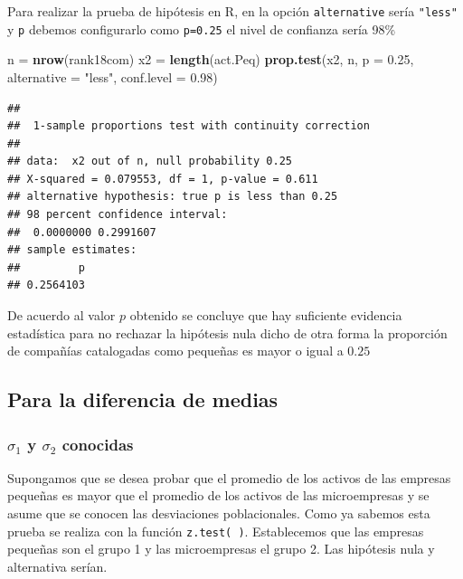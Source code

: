 \documentclass[letterpaper,]{book}
\newenvironment{Shaded}{\begin{snugshade}}{\end{snugshade}}
\newcommand{\DataTypeTok}[1]{\textcolor[rgb]{0.13,0.29,0.53}{#1}}
\newcommand{\FloatTok}[1]{\textcolor[rgb]{0.00,0.00,0.81}{#1}}
\newcommand{\KeywordTok}[1]{\textcolor[rgb]{0.13,0.29,0.53}{\textbf{#1}}}
\newcommand{\NormalTok}[1]{#1}
\newcommand{\StringTok}[1]{\textcolor[rgb]{0.31,0.60,0.02}{#1}}
\begin{document}
Para realizar la prueba de hipótesis en R, en la opción \texttt{alternative} sería \texttt{"less"} y \texttt{p} debemos configurarlo como \texttt{p=0.25} el nivel de confianza sería 98\%

\begin{Shaded}
\begin{Highlighting}[]
\NormalTok{n =}\StringTok{ }\KeywordTok{nrow}\NormalTok{(rank18com)}
\NormalTok{x2 =}\StringTok{ }\KeywordTok{length}\NormalTok{(act.Peq)}
\KeywordTok{prop.test}\NormalTok{(x2, n, }\DataTypeTok{p =} \FloatTok{0.25}\NormalTok{, }\DataTypeTok{alternative =} \StringTok{"less"}\NormalTok{,  }\DataTypeTok{conf.level =} \FloatTok{0.98}\NormalTok{)}
\end{Highlighting}
\end{Shaded}

\begin{verbatim}
## 
##  1-sample proportions test with continuity correction
## 
## data:  x2 out of n, null probability 0.25
## X-squared = 0.079553, df = 1, p-value = 0.611
## alternative hypothesis: true p is less than 0.25
## 98 percent confidence interval:
##  0.0000000 0.2991607
## sample estimates:
##         p 
## 0.2564103
\end{verbatim}

De acuerdo al valor \(p\) obtenido se concluye que hay suficiente evidencia estadística para no rechazar la hipótesis nula dicho de otra forma la proporción de compañías catalogadas como pequeñas es mayor o igual a \(0.25\)

\hypertarget{para-la-diferencia-de-medias}{%
\subsection{Para la diferencia de medias}\label{para-la-diferencia-de-medias}}

\hypertarget{sigma_1-y-sigma_2-conocidas-1}{%
\subsubsection{\texorpdfstring{\(\sigma_1\) y \(\sigma_2\) conocidas}{\textbackslash{}sigma\_1 y \textbackslash{}sigma\_2 conocidas}}\label{sigma_1-y-sigma_2-conocidas-1}}

Supongamos que se desea probar que el promedio de los activos de las empresas pequeñas es mayor que el promedio de los activos de las microempresas y se asume que se conocen las desviaciones poblacionales. Como ya sabemos esta prueba se realiza con la función \texttt{z.test(\ )}. Establecemos que las empresas pequeñas son el grupo 1 y las microempresas el grupo 2. Las hipótesis nula y alternativa serían.
\end{document}
